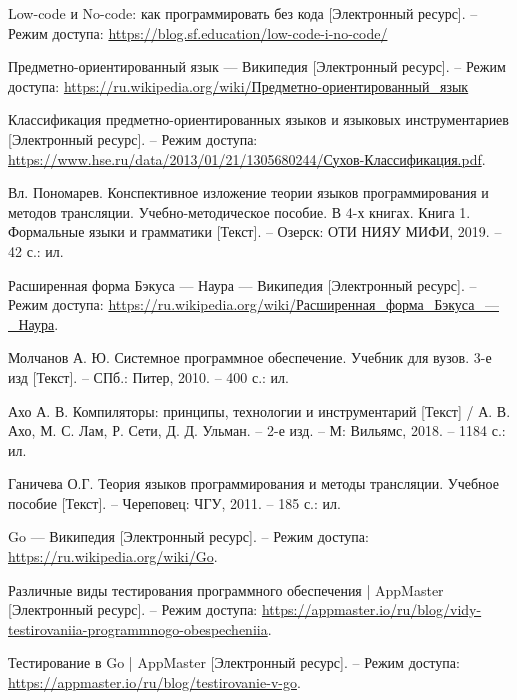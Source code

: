\newpage


\begin{references}
	
	\item\label{ref:nolowcode} Low-code и No-code: как программировать без кода [Электронный ресурс]. --
	Режим доступа: \url{https://blog.sf.education/low-code-i-no-code/}
	
	\item\label{ref:dsl} Предметно-ориентированный язык — Википедия [Электронный ресурс]. --
	Режим доступа: \url{https://ru.wikipedia.org/wiki/Предметно-ориентированный_язык}
	
	\item\label{ref:dsl_classification} Классификация предметно-ориентированных языков и языковых инструментариев [Электронный ресурс]. --
	Режим доступа: \url{https://www.hse.ru/data/2013/01/21/1305680244/Сухов-Классификация.pdf}.

	\item\label{ref:grammar} Вл. Пономарев. Конспективное изложение теории языков программирования и методов трансляции.
	Учебно-методическое пособие. В 4-х книгах. Книга 1.
	Формальные языки и грамматики [Текст]. -- Озерск: ОТИ НИЯУ МИФИ, 2019. -- 42 с.: ил.

	\item\label{ref:rbnf} Расширенная форма Бэкуса — Наура — Википедия [Электронный ресурс]. --
	Режим доступа: \url{https://ru.wikipedia.org/wiki/Расширенная_форма_Бэкуса_—_Наура}.

	\item\label{ref:lexlem} Молчанов А. Ю. Системное программное обеспечение.
	Учебник для вузов. 3-е изд [Текст]. -- СПб.: Питер, 2010. -- 400 с.: ил.

	\item\label{ref:dragon} Ахо А. В. Компиляторы: принципы, технологии и инструментарий [Текст] /
	А. В. Ахо, М. С. Лам, Р. Сети, Д. Д. Ульман. -- 2-е изд. -- М: Вильямс, 2018. -- 1184 с.: ил.

	\item\label{ref:ganicheva} Ганичева О.Г. Теория языков программирования и методы трансляции.
	Учебное пособие [Текст]. -- Череповец: ЧГУ, 2011. -- 185 с.: ил.

	\item\label{ref:golang} Go — Википедия [Электронный ресурс]. --
	Режим доступа: \url{https://ru.wikipedia.org/wiki/Go}.

	\item\label{ref:testing} Различные виды тестирования программного обеспечения | AppMaster [Электронный ресурс]. --
	Режим доступа: \url{https://appmaster.io/ru/blog/vidy-testirovaniia-programmnogo-obespecheniia}.

	\item\label{ref:go-testing} Тестирование в Go | AppMaster [Электронный ресурс]. --
	Режим доступа: \url{https://appmaster.io/ru/blog/testirovanie-v-go}.

	\label{ref:total}
\end{references}
